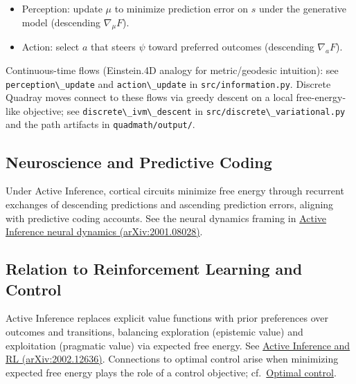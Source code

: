 \documentclass[
  10pt,
]{article}
\newcommand{\passthrough}[1]{#1}
\providecommand{\tightlist}{%
  \setlength{\itemsep}{0pt}\setlength{\parskip}{0pt}}
\begin{document}
\begin{itemize}
\tightlist
\item
  Perception: update \(\mu\) to minimize prediction error on \(s\) under
  the generative model (descending \(\nabla_{\mu} F\)).
\item
  Action: select \(a\) that steers \(\psi\) toward preferred outcomes
  (descending \(\nabla_{a} F\)).
\end{itemize}

Continuous-time flows (Einstein.4D analogy for metric/geodesic
intuition): see \passthrough{\lstinline!perception\_update!} and
\passthrough{\lstinline!action\_update!} in
\passthrough{\lstinline!src/information.py!}. Discrete Quadray moves
connect to these flows via greedy descent on a local free-energy-like
objective; see \passthrough{\lstinline!discrete\_ivm\_descent!} in
\passthrough{\lstinline!src/discrete\_variational.py!} and the path
artifacts in \passthrough{\lstinline!quadmath/output/!}.

\hypertarget{neuroscience-and-predictive-coding}{%
\subsection{Neuroscience and Predictive
Coding}\label{neuroscience-and-predictive-coding}}

Under Active Inference, cortical circuits minimize free energy through
recurrent exchanges of descending predictions and ascending prediction
errors, aligning with predictive coding accounts. See the neural
dynamics framing in \href{https://arxiv.org/abs/2001.08028}{Active
Inference neural dynamics (arXiv:2001.08028)}.

\hypertarget{relation-to-reinforcement-learning-and-control}{%
\subsection{Relation to Reinforcement Learning and
Control}\label{relation-to-reinforcement-learning-and-control}}

Active Inference replaces explicit value functions with prior
preferences over outcomes and transitions, balancing exploration
(epistemic value) and exploitation (pragmatic value) via expected free
energy. See \href{https://arxiv.org/abs/2002.12636}{Active Inference and
RL (arXiv:2002.12636)}. Connections to optimal control arise when
minimizing expected free energy plays the role of a control objective;
cf.~\href{https://en.wikipedia.org/wiki/Optimal_control}{Optimal
control}.
\end{document}
